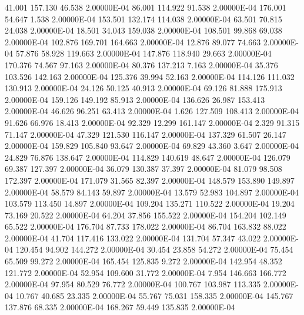    41.001   157.130    46.538  2.00000E-04
    86.001   114.922    91.538  2.00000E-04
   176.001    54.647     1.538  2.00000E-04
   153.501   132.174   114.038  2.00000E-04
    63.501    70.815    24.038  2.00000E-04
    18.501    34.043   159.038  2.00000E-04
   108.501    99.868    69.038  2.00000E-04
   102.876   169.701   164.663  2.00000E-04
    12.876    89.077    74.663  2.00000E-04
    57.876    58.928   119.663  2.00000E-04
   147.876   118.940    29.663  2.00000E-04
   170.376    74.567    97.163  2.00000E-04
    80.376   137.213     7.163  2.00000E-04
    35.376   103.526   142.163  2.00000E-04
   125.376    39.994    52.163  2.00000E-04
   114.126   111.032   130.913  2.00000E-04
    24.126    50.125    40.913  2.00000E-04
    69.126    81.888   175.913  2.00000E-04
   159.126   149.192    85.913  2.00000E-04
   136.626    26.987   153.413  2.00000E-04
    46.626    96.251    63.413  2.00000E-04
     1.626   127.509   108.413  2.00000E-04
    91.626    66.976    18.413  2.00000E-04
    92.329    12.299   161.147  2.00000E-04
     2.329    91.315    71.147  2.00000E-04
    47.329   121.530   116.147  2.00000E-04
   137.329    61.507    26.147  2.00000E-04
   159.829   105.840    93.647  2.00000E-04
    69.829    43.360     3.647  2.00000E-04
    24.829    76.876   138.647  2.00000E-04
   114.829   140.619    48.647  2.00000E-04
   126.079    69.387   127.397  2.00000E-04
    36.079   130.387    37.397  2.00000E-04
    81.079    98.508   172.397  2.00000E-04
   171.079    31.565    82.397  2.00000E-04
   148.579   153.890   149.897  2.00000E-04
    58.579    84.143    59.897  2.00000E-04
    13.579    52.983   104.897  2.00000E-04
   103.579   113.450    14.897  2.00000E-04
   109.204   135.271   110.522  2.00000E-04
    19.204    73.169    20.522  2.00000E-04
    64.204    37.856   155.522  2.00000E-04
   154.204   102.149    65.522  2.00000E-04
   176.704    87.733   178.022  2.00000E-04
    86.704   163.832    88.022  2.00000E-04
    41.704   117.416   133.022  2.00000E-04
   131.704    57.347    43.022  2.00000E-04
   120.454    94.902   144.272  2.00000E-04
    30.454    23.858    54.272  2.00000E-04
    75.454    65.509    99.272  2.00000E-04
   165.454   125.835     9.272  2.00000E-04
   142.954    48.352   121.772  2.00000E-04
    52.954   109.600    31.772  2.00000E-04
     7.954   146.663   166.772  2.00000E-04
    97.954    80.529    76.772  2.00000E-04
   100.767   103.987   113.335  2.00000E-04
    10.767    40.685    23.335  2.00000E-04
    55.767    75.031   158.335  2.00000E-04
   145.767   137.876    68.335  2.00000E-04
   168.267    59.449   135.835  2.00000E-04

